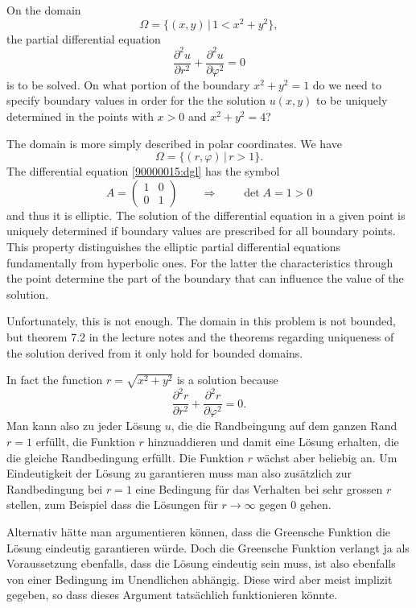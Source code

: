 On the domain
\[
\Omega = \{ (x,y)\,|\, 1 < x^2 + y^2\},
\]
the partial differential equation
\begin{equation}
\frac{\partial^2 u}{\partial r^2}
+
\frac{\partial^2 u}{\partial \varphi^2}
=
0
\label{90000015:dgl}
\end{equation}
is to be solved.
On what portion of the boundary
$x^2 +y^2 = 1$
do we need to specify boundary values in order for the the solution $u(x,y)$
to be uniquely determined in the points with $x>0$ and $x^2 + y^2 = 4$?

\begin{loesung}
The domain is more simply described in polar coordinates.
We have
\[
\Omega = \{ (r,\varphi)\,|\, r>1\}.
\]
The differential equation \eqref{90000015:dgl} has the symbol
\[
A
=
\begin{pmatrix}
1&0\\
0&1
\end{pmatrix}
\qquad\Rightarrow\qquad
\det A=1>0
\]
and thus it is elliptic.
The solution of the differential equation in a given point is uniquely
determined if boundary values are prescribed for all boundary points.
This property distinguishes the elliptic partial differential equations
fundamentally from hyperbolic ones.
For the latter the characteristics through the point determine the
part of the boundary that can influence the value of the solution.

Unfortunately, this is not enough.
The domain in this problem is not bounded, but theorem 7.2 in the
lecture notes and the theorems regarding uniqueness of the solution
derived from it only hold for bounded domains.

In fact the function $r=\sqrt{x^2+y^2}$ is a solution because
\[
\frac{\partial^2 r}{\partial r^2} + \frac{\partial^2 r}{\partial \varphi^2}=0.
\]
Man kann also zu jeder Lösung $u$, die die Randbeingung auf dem ganzen Rand
$r=1$ erfüllt, die Funktion $r$ hinzuaddieren und damit eine Lösung erhalten,
die die gleiche Randbedingung erfüllt.
Die Funktion $r$ wächst aber beliebig an.
Um Eindeutigkeit der Lösung zu garantieren muss man also zusätzlich zur
Randbedingung bei $r=1$ eine Bedingung für das Verhalten bei sehr grossen $r$
stellen, zum Beispiel dass die Lösungen für $r\to\infty$ gegen $0$ gehen.

Alternativ hätte man argumentieren können, dass die Greensche Funktion 
die Lösung eindeutig garantieren würde.
Doch die Greensche Funktion verlangt ja als Voraussetzung ebenfalls,
dass die Lösung eindeutig sein muss, ist also ebenfalls von einer
Bedingung im Unendlichen abhängig.
Diese wird aber meist implizit gegeben, so dass dieses Argument
tatsächlich funktionieren könnte.


\end{loesung}
